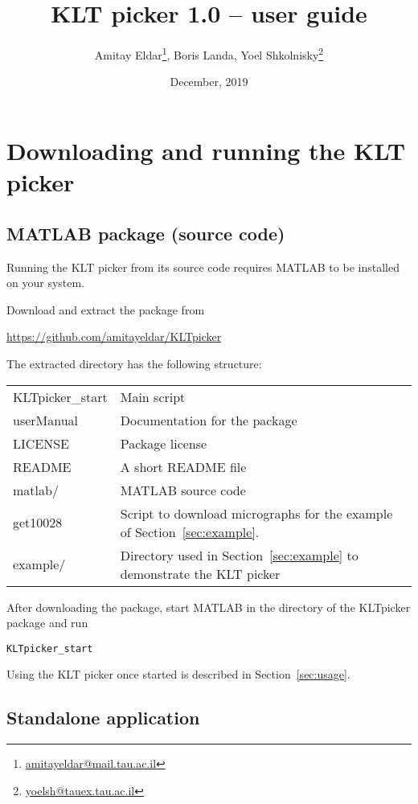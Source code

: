 \documentclass[12pt,a4paper]{article}
\title{KLT picker 1.0 --  user guide}
\author{Amitay Eldar\footnote{\protect\url{amitayeldar@mail.tau.ac.il}}, Boris Landa, Yoel Shkolnisky\footnote{\protect\url{yoelsh@tauex.tau.ac.il}}}
\date{December, 2019}
\begin{document}
\maketitle

\section{Downloading and running the KLT picker}\label{sec:downloading}

\subsection{MATLAB package (source code)}
Running the KLT picker from its source code requires MATLAB to be installed on your system.

\bigskip

Download and extract the package from
\begin{center}
\url{https://github.com/amitayeldar/KLTpicker}
\end{center}

The extracted directory has the following structure:
\begin{center}
\begin{tabular}{lp{}}
\textsf{KLTpicker\_start}  & Main script \\
\textsf{userManual} & Documentation for the package \\
\textsf{LICENSE} & Package license \\
\textsf{README} & A short README file  \\
\textsf{matlab/} & MATLAB source code \\
\textsf{get10028} & Script to download micrographs for the example of Section~\ref{sec:example}. \\
\textsf{example/} & Directory used in Section~\ref{sec:example} to demonstrate the KLT picker
\end{tabular}
\end{center}

After downloading the package, start MATLAB in the directory of the KLTpicker package and run
\begin{center}
\texttt{KLTpicker\_start}
\end{center}

Using the KLT picker once started is described in Section~\ref{sec:usage}.

\subsection{Standalone application}
\end{document}
